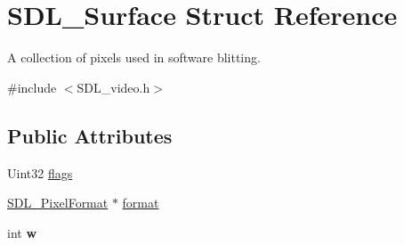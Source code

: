 \hypertarget{structSDL__Surface}{\section{S\+D\+L\+\_\+\+Surface Struct Reference}
\label{structSDL__Surface}
}


A collection of pixels used in software blitting.  




{\ttfamily \#include $<$S\+D\+L\+\_\+video.\+h$>$}

\subsection*{Public Attributes}
\begin{DoxyCompactItemize}
\item 
Uint32 \hyperlink{structSDL__Surface_a86d78b665d5dfd7aa1dd9696b067641b}{flags}
\item 
\hyperlink{structSDL__PixelFormat}{S\+D\+L\+\_\+\+Pixel\+Format} $\ast$ \hyperlink{structSDL__Surface_a8558348b1d6ad1def317d8c75e0f0080}{format}
\item 
\hypertarget{structSDL__Surface_a9b0ec7185dcdb2a3530a9160a6ea83d9}{int {\bfseries w}}\label{structSDL__Surface_a9b0ec7185dcdb2a3530a9160a6ea83d9}


\end{DoxyCompactItemize}

